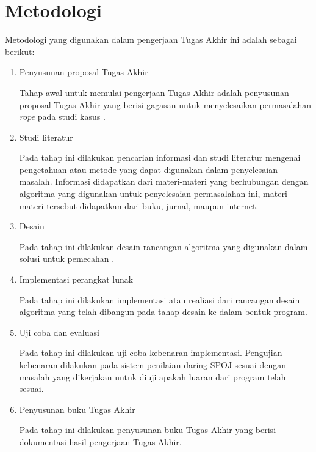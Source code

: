 \section{Metodologi}
Metodologi yang digunakan dalam pengerjaan Tugas Akhir ini adalah sebagai berikut:
\begin{enumerate}
	
	\item Penyusunan proposal Tugas Akhir
	
	Tahap awal untuk memulai pengerjaan Tugas Akhir adalah penyusunan proposal Tugas Akhir yang berisi gagasan untuk menyelesaikan permasalahan \textit{rope} pada studi kasus \problem.
	
	\item Studi literatur
	
	Pada tahap ini dilakukan pencarian informasi dan studi literatur mengenai pengetahuan atau metode yang dapat digunakan dalam penyelesaian masalah. Informasi didapatkan dari materi-materi yang berhubungan dengan algoritma yang digunakan untuk penyelesaian permasalahan ini, materi-materi tersebut didapatkan dari buku, jurnal, maupun internet.
	
	\item Desain
	
	Pada tahap ini dilakukan desain rancangan algoritma yang digunakan dalam solusi untuk pemecahan \problem.
	
	\item Implementasi perangkat lunak
	
	Pada tahap ini dilakukan implementasi atau realiasi dari rancangan desain algoritma yang telah dibangun pada tahap desain ke dalam bentuk program.
	
	\item Uji coba dan evaluasi
	
	Pada tahap ini dilakukan uji coba kebenaran implementasi. Pengujian kebenaran dilakukan pada sistem penilaian daring SPOJ sesuai dengan masalah yang dikerjakan untuk diuji apakah luaran dari program telah sesuai.
	
	\item Penyusunan buku Tugas Akhir
	
	Pada tahap ini dilakukan penyusunan buku Tugas Akhir yang berisi dokumentasi hasil pengerjaan Tugas Akhir.
\end{enumerate}

